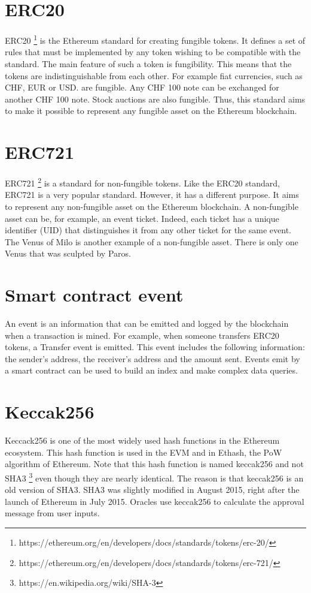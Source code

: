 \documentclass[a4paper,11pt,oneside]{report}
\begin{document}
\section{ERC20}
ERC20 \footnote{https://ethereum.org/en/developers/docs/standards/tokens/erc-20/} is the Ethereum standard for creating fungible tokens. It defines a set of rules that must be implemented by any token wishing to be compatible with the standard. The main feature of such a token is fungibility. This means that the tokens are indistinguishable from each other. For example fiat currencies, such as CHF, EUR or USD. are fungible. Any CHF 100 note can be exchanged for another CHF 100 note. Stock auctions are also fungible. Thus, this standard aims to make it possible to represent any fungible asset on the Ethereum blockchain. 

\section{ERC721}
ERC721 \footnote{https://ethereum.org/en/developers/docs/standards/tokens/erc-721/} is a standard for non-fungible tokens. Like the ERC20 standard, ERC721 is a very popular standard. However, it has a different purpose. It aims to represent any non-fungible asset on the Ethereum blockchain. A non-fungible asset can be, for example, an event ticket. Indeed, each ticket has a unique identifier (UID) that distinguishes it from any other ticket for the same event. The Venus of Milo is another example of a non-fungible asset. There is only one Venus that was sculpted by Paros.

\section{Smart contract event}
An event is an information that can be emitted and logged by the blockchain when a transaction is mined. For example, when someone transfers ERC20 tokens, a Transfer event is emitted. This event includes the following information: the sender's address, the receiver's address and the amount sent. Events emit by a smart contract can be used to build an index and make complex data queries.

\section{Keccak256}
Keccack256 is one of the most widely used hash functions in the Ethereum ecosystem. This hash function is used in the EVM and in Ethash, the PoW algorithm of Ethereum. Note that this hash function is named keccak256 and not SHA3 \footnote{https://en.wikipedia.org/wiki/SHA-3} even though they are nearly identical. The reason is that keccak256 is an old version of SHA3. SHA3 was slightly modified in August 2015, right after the launch of Ethereum in July 2015. Oracles use keccak256 to calculate the approval message from user inputs.
\end{document}
